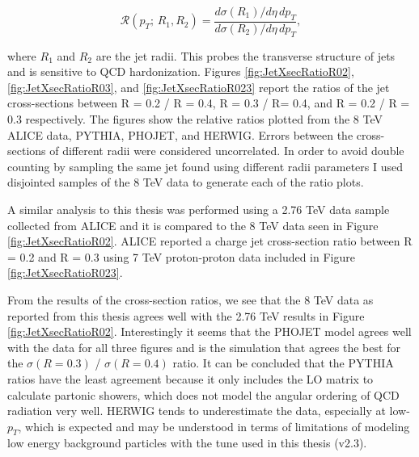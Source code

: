 \begin{equation}
\mathscr{R} (p_{T}; \, R_{1},R_{2}) = \frac{d\sigma(R_{1}) /d\eta \, dp_{T} }{d\sigma (R_{2}) /d\eta \, dp_{T}},
\label{eq:jetxsecratio}
\end{equation}

\noindent
where $R_{1}$ and $R_{2}$ are the jet radii. This probes the transverse structure of jets and is sensitive to QCD hardonization\cite{SOYEZ201159}.  Figures \ref{fig:JetXsecRatioR02}, \ref{fig:JetXsecRatioR03}, and \ref{fig:JetXsecRatioR023} report the ratios of the jet cross-sections between R = 0.2 / R = 0.4, R = 0.3 / R= 0.4, and R = 0.2 / R = 0.3 respectively.  The figures show the relative ratios plotted from the 8 TeV ALICE data, PYTHIA, PHOJET, and HERWIG.  Errors between the cross-sections of different radii were considered uncorrelated.  In order to avoid double counting by sampling the same jet found using different radii parameters I used disjointed samples of the 8 TeV data to generate each of the ratio plots.



A similar analysis to this thesis was performed using a 2.76 TeV  data sample collected from ALICE\cite{MA2013319} and it is compared to the 8 TeV data seen in Figure \ref{fig:JetXsecRatioR02}.  ALICE reported a charge jet cross-section ratio between R = 0.2 and R = 0.3 using 7 TeV proton-proton data\cite{Acharya:2018eat} included in Figure \ref{fig:JetXsecRatioR023}.

From the results of the cross-section ratios, we see that the 8 TeV data as reported from this thesis agrees well with the 2.76 TeV results in Figure \ref{fig:JetXsecRatioR02}.  Interestingly it seems that the PHOJET model agrees well with the data for all three figures and is the simulation that agrees the best for the $\sigma (R = 0.3)$ / $\sigma (R = 0.4)$ ratio.  It can be concluded that the PYTHIA ratios have the least agreement because it only includes the LO matrix to calculate partonic showers, which does not model the angular ordering of QCD radiation very well.  HERWIG tends to underestimate the data, especially at low-$p_{T}$, which is expected and may be understood in terms of limitations of modeling low energy background particles with the tune used in this thesis (v2.3).  

